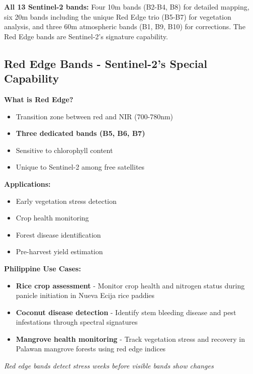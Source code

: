\documentclass[
  letterpaper,
  DIV=11,
  numbers=noendperiod]{scrartcl}
\providecommand{\tightlist}{%
  \setlength{\itemsep}{0pt}\setlength{\parskip}{0pt}}
\begin{document}
\textbf{All 13 Sentinel-2 bands:} Four 10m bands (B2-B4, B8) for
detailed mapping, six 20m bands including the unique Red Edge trio
(B5-B7) for vegetation analysis, and three 60m atmospheric bands (B1,
B9, B10) for corrections. The Red Edge bands are Sentinel-2's signature
capability.

\subsection{Red Edge Bands - Sentinel-2's Special
Capability}\label{red-edge-bands---sentinel-2s-special-capability}

\textbf{What is Red Edge?}

\begin{itemize}
\tightlist
\item
  Transition zone between red and NIR (700-780nm)
\item
  \textbf{Three dedicated bands (B5, B6, B7)}
\item
  Sensitive to chlorophyll content
\item
  Unique to Sentinel-2 among free satellites
\end{itemize}

\textbf{Applications:}

\begin{itemize}
\tightlist
\item
  Early vegetation stress detection
\item
  Crop health monitoring
\item
  Forest disease identification
\item
  Pre-harvest yield estimation
\end{itemize}

\textbf{Philippine Use Cases:}

\begin{itemize}
\tightlist
\item
  \textbf{Rice crop assessment} - Monitor crop health and nitrogen
  status during panicle initiation in Nueva Ecija rice paddies
\item
  \textbf{Coconut disease detection} - Identify stem bleeding disease
  and pest infestations through spectral signatures
\item
  \textbf{Mangrove health monitoring} - Track vegetation stress and
  recovery in Palawan mangrove forests using red edge indices
\end{itemize}

\emph{Red edge bands detect stress weeks before visible bands show
changes}
\end{document}
